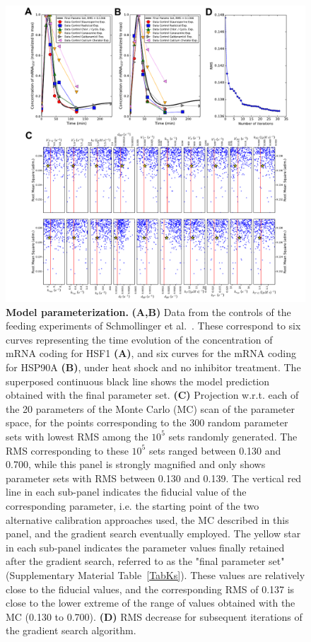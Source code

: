 \documentclass[oneside, 10pt, a4paper, twocolumn]{article}
\begin{document}
\begin{figure}
\centering
\includegraphics[width=\textwidth]{Figure2_Paper.pdf}
\caption{\small{\textbf{Model parameterization.} \textbf{(A,B)} Data from the controls of the feeding
experiments of Schmollinger et al.~\cite{Schmollinger2013}. These correspond to six curves
representing the time evolution of the concentration of mRNA coding
for HSF1 \textbf{(A)}, and six curves for the mRNA coding for HSP90A \textbf{(B)}, under heat
shock and no inhibitor treatment. The superposed continuous black line shows the model prediction obtained with the final parameter set. \textbf{(C)} Projection w.r.t. each of the 20 parameters of the Monte Carlo (MC) scan of the parameter space, for the points corresponding to the 300 random parameter sets with lowest RMS {among the $10^5$ sets randomly generated. The RMS corresponding to these $10^5$ sets ranged between 0.130 and 0.700, while this panel is strongly magnified and only shows parameter sets with RMS between 0.130 and 0.139. The vertical red line in each sub-panel indicates the fiducial value of the corresponding parameter, i.e. the starting point of the two alternative calibration approaches used, the MC described in this panel, and the gradient search eventually employed. The yellow star in each sub-panel indicates the parameter values finally retained after the gradient search, referred to as the "final parameter set" (Supplementary Material Table~\ref{TabKs}). These values are relatively close to the fiducial values, and the corresponding RMS of 0.137 is close to the lower extreme of the range of values obtained with the MC (0.130 to 0.700).} \textbf{(D)}} RMS decrease for subsequent iterations of the gradient search algorithm.}
\label{Figure2label}
\end{figure}
\end{document}
